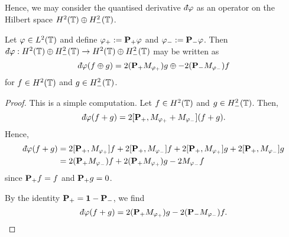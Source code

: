 Hence, we may consider the quantised derivative $\qd\varphi$ as an operator on
the Hilbert space $H^2(\mathbb{T})\oplus H^2_-(\mathbb{T})$.

\begin{lemma}
    Let $\varphi \in L^2(\mathbb{T})$ and define $\varphi_+ := \mathbf{P}_+ \varphi$ and $\varphi_- := \mathbf{P}_- \varphi$. Then $\qd\varphi:H^2(\Circ)\oplus H^2_-(\Circ)\rightarrow H^2(\Circ)\oplus H^2_-(\Circ)$ may be written as
    \begin{equation*}
        \qd\varphi(f\oplus g) = 
            2(\Proj_+M_{\varphi_+})g \oplus
            -2(\Proj_-M_{\varphi_-})f
    \end{equation*}
    for $f \in H^2(\mathbb{T})$ and $g \in H^2_-(\mathbb{T})$.
\end{lemma}
\begin{proof}
    This is a simple computation. Let $f \in H^2(\mathbb{T})$ and $g \in H^2_-(\mathbb{T})$. Then,
    \begin{equation*}
        \qd\varphi(f+g) = 2[\Proj_+,M_{\varphi_+}+M_{\varphi_-}](f+g).
    \end{equation*}
    Hence,
    \begin{align*}
        \qd\varphi(f+g) &= 2[\Proj_+,M_{\varphi_+}]f + 2[\Proj_+,M_{\varphi_-}]f + 2[\Proj_+,M_{\varphi_+}]g + 2[\Proj_+,M_{\varphi_-}]g\\
        &= 2(\Proj_+M_{\varphi_-})f+2(\Proj_+M_{\varphi_+})g-2M_{\varphi_-}f
    \end{align*}
    since $\mathbf{P}_+f = f$ and $\mathbf{P}_+g = 0$.
    
    By the identity $\mathbf{P}_+ = \mathbf{1}-\mathbf{P}_-$, we find
    \begin{equation*}
        \qd\varphi(f+g) = 2(\Proj_+M_{\varphi_+})g - 2(\Proj_-M_{\varphi_-})f.
    \end{equation*}
\end{proof}


